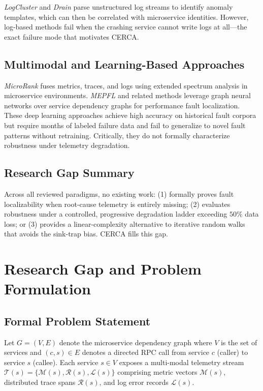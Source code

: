 \documentclass[conference]{IEEEtran}
\begin{document}
\textit{LogCluster} \cite{vaarandi2015} and \textit{Drain} \cite{he2017} parse unstructured log streams to identify anomaly templates, which can then be correlated with microservice identities. However, log-based methods fail when the crashing service cannot write logs at all---the exact failure mode that motivates CERCA.

\subsection{Multimodal and Learning-Based Approaches}

\textit{MicroRank} \cite{yu2021} fuses metrics, traces, and logs using extended spectrum analysis in microservice environments. \textit{MEPFL} and related methods leverage graph neural networks over service dependency graphs for performance fault localization. These deep learning approaches achieve high accuracy on historical fault corpora but require months of labeled failure data and fail to generalize to novel fault patterns without retraining. Critically, they do not formally characterize robustness under telemetry degradation.

\subsection{Research Gap Summary}

Across all reviewed paradigms, no existing work: (1) formally proves fault localizability when root-cause telemetry is entirely missing; (2) evaluates robustness under a controlled, progressive degradation ladder exceeding $50\%$ data loss; or (3) provides a linear-complexity alternative to iterative random walks that avoids the sink-trap bias. CERCA fills this gap.

\section{Research Gap and Problem Formulation}

\subsection{Formal Problem Statement}

Let $G = (V, E)$ denote the microservice dependency graph where $V$ is the set of services and $(c, s) \in E$ denotes a directed RPC call from service $c$ (caller) to service $s$ (callee). Each service $s \in V$ exposes a multi-modal telemetry stream $\mathcal{T}(s) = \{\mathcal{M}(s), \mathcal{R}(s), \mathcal{L}(s)\}$ comprising metric vectors $\mathcal{M}(s)$, distributed trace spans $\mathcal{R}(s)$, and log error records $\mathcal{L}(s)$.
\end{document}
